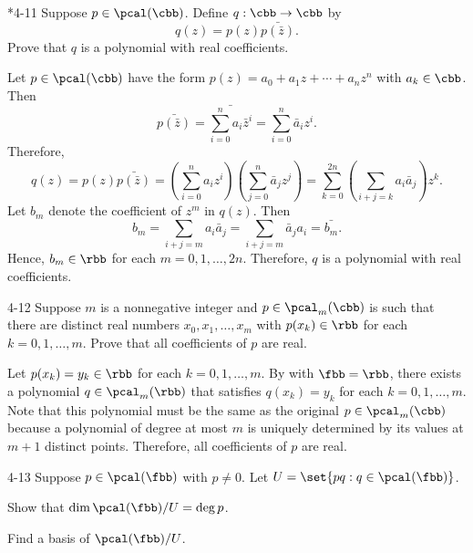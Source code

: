 \begin{exercise}*{4-11}
    Suppose $p \in \pcal(\cbb)$.
	Define $q: \cbb \to \cbb$ by
    \[
    	q(z) = p(z) \bar{p(\bar{z})}.
    \]
    Prove that $q$ is a polynomial with real coefficients.
\end{exercise}

\begin{sol}
    Let $p \in \pcal(\cbb)$ have the form $p(z) = a_0 + a_1 z + \cdots + a_n z^n$ with $a_k \in \cbb$.
	Then
    \[
    	\bar{p(\bar z)} = \bar{\sum_{i = 0}^n a_i \bar z^i} = \sum_{i = 0}^n \bar a_i z^i.
    \]
    Therefore,
    \[
    	q(z) = p(z) \bar{p(\bar z)} = \left(\sum_{i = 0}^n a_i z^i\right)\left(\sum_{j = 0}^n \bar a_j z^j\right) = \sum_{k = 0}^{2n} \left(\sum_{i + j = k} a_i \bar a_j\right) z^k.
    \]
    Let $b_m$ denote the coefficient of $z^m$ in $q(z)$.
	Then
    \[
    	b_m = \sum_{i + j = m} a_i \bar a_j = \sum_{i + j = m} \bar a_j a_i = \bar{b_m}.
    \]
    Hence, $b_m \in \rbb$ for each $m = 0, 1, \ldots, 2n$.
	Therefore, $q$ is a polynomial with real coefficients.
\end{sol}

\begin{exercise}{4-12}
    Suppose $m$ is a nonnegative integer and $p \in \pcal_m(\cbb)$ is such that there are distinct real numbers $x_0, x_1, \ldots, x_m$ with $p(x_k) \in \rbb$ for each $k = 0, 1, \ldots, m$.
	Prove that all coefficients of $p$ are real.
\end{exercise}

\begin{sol}
    Let $p(x_k) = y_k \in \rbb$ for each $k = 0, 1, \ldots, m$.
	By  with $\fbb = \rbb$, there exists a polynomial $q \in \pcal_m(\rbb)$ that satisfies $q(x_k) = y_k$ for each $k = 0, 1, \ldots, m$.
	Note that this polynomial must be the same as the original $p \in \pcal_m(\cbb)$ because a polynomial of degree at most $m$ is uniquely determined by its values at $m+1$ distinct points.
	Therefore, all coefficients of $p$ are real.
\end{sol}

\begin{exercise}{4-13}
    Suppose $p \in \pcal(\fbb)$ with $p \neq 0$.
	Let $U = \set{pq : q \in \pcal(\fbb)}$.
    \begin{subexercises}
        \item Show that $\dim \pcal(\fbb) / U = \deg p$.
        \item Find a basis of $\pcal(\fbb) / U$.
    \end{subexercises}
\end{exercise}

